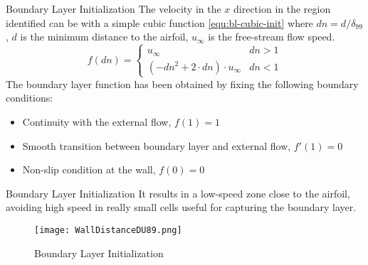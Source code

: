     \begin{frame}{Boundary Layer Initialization}
    The velocity in the $x$ direction in the region identified can be with a simple cubic function \eqref{equ:bl-cubic-init} where $dn = d/\delta_{99}$, $d$ is the minimum distance to the airfoil, $u_\infty$ is the free-stream flow speed.
    \begin{equation}
        f(dn) = 
        \begin{cases}
            u_\infty & dn>1\\
            ( -dn^2+2\cdot dn )\cdot u_\infty &  dn<1
        \end{cases}
        \label{equ:bl-cubic-init}
    \end{equation}
     The boundary layer function has been obtained by fixing the following boundary conditions:
    \begin{itemize}
        \item Continuity with the external flow, $f(1)=1$ 
        \item Smooth transition between boundary layer and external flow, $f'(1)=0$ 
        \item Non-slip condition at the wall, $f(0)=0$
    \end{itemize}
    \end{frame}
    
    \begin{frame}{Boundary Layer Initialization}
    It results in a low-speed zone close to the airfoil, avoiding high speed in really small cells useful for capturing the boundary layer.
    \begin{figure}
             \centering
             \texttt{[image: WallDistanceDU89.png]}
             \caption{Boundary Layer Initialization}
             \label{fig:wall-distance-init}
    \end{figure} 
    \end{frame}
    